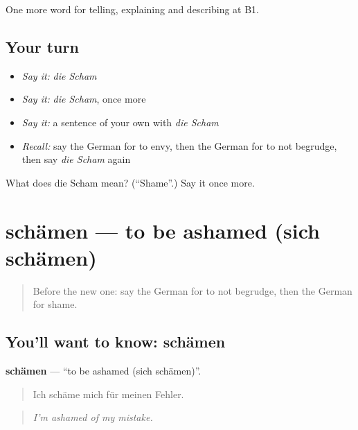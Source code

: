 \begin{grammarlens}[title={What you've built}]
One more word for telling, explaining and describing at B1.
\end{grammarlens}

\subsection*{Your turn}
\begin{itemize}
\raggedright
  \item \emph{Say it:} \emph{die Scham}
  \item \emph{Say it:} \emph{die Scham}, once more
  \item \emph{Say it:} a sentence of your own with \emph{die Scham}
  \item \emph{Recall:} say the German for to envy, then the German for to not begrudge, then say \emph{die Scham} again
\end{itemize}

\begin{tcolorbox}[breakable,colback=teal!4,colframe=teal!35!black,title={Before you move on}]
What does die Scham mean? (\textquotedblleft{}Shame\textquotedblright{}.) Say it once more.
\end{tcolorbox}
\section[schämen]{schämen — to be ashamed (sich schämen)}

\label{lesson:GE-C467-schaemen}



\begin{quote}
Before the new one: say the German for to not begrudge, then the German for shame.
\end{quote}

\subsection*{You'll want to know: schämen}
\textbf{schämen} — \textquotedblleft{}to be ashamed (sich schämen)\textquotedblright{}.

\begin{quote}
Ich schäme mich für meinen Fehler.
\end{quote}

\begin{quote}
\emph{I'm ashamed of my mistake.}
\end{quote}

